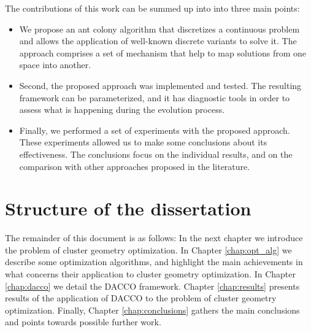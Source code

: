 The contributions of this work can be summed up into into three main points:
\begin{itemize}
	\item We propose an ant colony algorithm that discretizes a continuous problem and allows the application of well-known discrete variants to solve it. The approach comprises a set of mechanism that help to map solutions from one space into another.

	\item Second, the proposed approach was implemented and tested. The resulting framework can be parameterized, and it has diagnostic tools in order to assess what is happening during the evolution process. 

	\item Finally, we performed a set of experiments with the proposed approach. These experiments allowed us to make some conclusions about its effectiveness. The conclusions focus on the individual results, and on the comparison with other approaches proposed in the literature.

\end{itemize}

\section{Structure of the dissertation}
The remainder of this document is as follows: In the next chapter we introduce the problem of cluster geometry optimization. In Chapter \ref{chap:opt_alg} we describe some optimization algorithms, and highlight the main achievements in what concerns their application to cluster geometry optimization. In Chapter \ref{chap:dacco} we detail the DACCO framework. Chapter \ref{chap:results} presents results of the application of DACCO to the problem of cluster geometry optimization. Finally, Chapter \ref{chap:conclusions} gathers the main conclusions and points towards possible further work.

